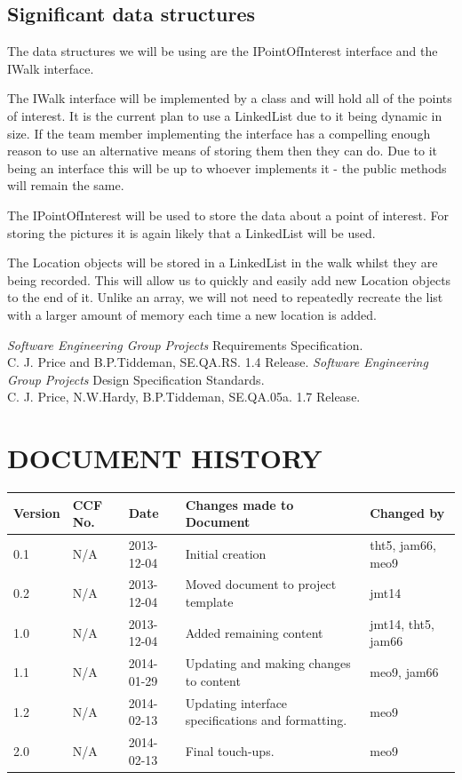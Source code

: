 \documentclass{project}
\begin{document}
\subsection{Significant data structures}
The data structures we will be using are the IPointOfInterest interface and the
IWalk interface.

The IWalk interface will be implemented by a class and will hold all of the
points of interest. It is the current plan to use a LinkedList due to it being
dynamic in size. If the team member implementing the interface has a compelling
enough reason to use an alternative means of storing them then they can do. Due
to it being an interface this will be up to whoever implements it - the public
methods will remain the same.

The IPointOfInterest will be used to store the data about a point of interest.
For storing the pictures it is again likely that a LinkedList will be used.

The Location objects will be stored in a LinkedList in the walk
whilst they are being recorded. This will allow us to quickly and easily add
new Location objects to the end of it. Unlike an array, we will not need to
repeatedly recreate the list with a larger amount of memory each time a new
location is added.

\clearpage
{}
\begin{thebibliography}{5}
 \emph{Software Engineering Group Projects}
Requirements Specification. \\
C. J. Price and B.P.Tiddeman, SE.QA.RS. 1.4 Release.
 \emph{Software Engineering Group Projects}
Design Specification Standards. \\
C. J. Price, N.W.Hardy, B.P.Tiddeman, SE.QA.05a. 1.7 Release.
\end{thebibliography}
\section*{DOCUMENT HISTORY}
\begin{tabular}{ | p{1.5cm} | p{1cm} | p{2cm} | p{6cm}| p{1.5cm}| }
\hline
Version & CCF No. & Date & Changes made to Document & Changed by \\
\hline
0.1 & N/A & 2013-12-04 & Initial creation & tht5, jam66, meo9 \\
\hline
0.2 & N/A & 2013-12-04 & Moved document to project template & jmt14 \\
\hline
1.0 & N/A & 2013-12-04 & Added remaining content & jmt14, tht5, jam66 \\
\hline
1.1 & N/A & 2014-01-29 & Updating and making changes to content & meo9, jam66 \\
\hline
1.2 & N/A & 2014-02-13 & Updating interface specifications and formatting. & meo9 \\
\hline
2.0 & N/A & 2014-02-13 & Final touch-ups. & meo9 \\
\hline
\end{tabular}
\label{thelastpage}
\end{document}
